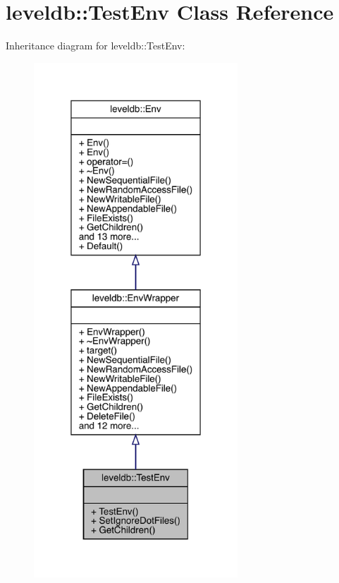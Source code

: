 \hypertarget{classleveldb_1_1_test_env}{}\section{leveldb\+::Test\+Env Class Reference}
\label{classleveldb_1_1_test_env}


Inheritance diagram for leveldb\+::Test\+Env\+:
\nopagebreak
\begin{figure}[H]
\begin{center}
\leavevmode
\includegraphics[width=217pt]{classleveldb_1_1_test_env__inherit__graph}
\end{center}
\end{figure}


